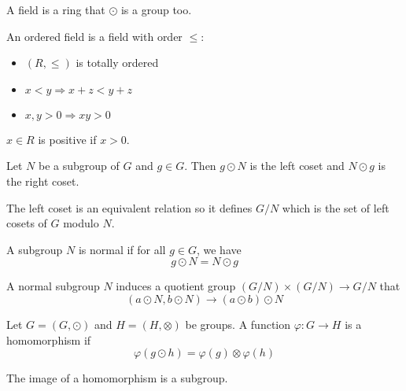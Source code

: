 \begin{definition}[field]
    A field is a ring that $\odot$ is a group too.
\end{definition}

\begin{definition}
    An ordered field is a field with order $\leq$:
    \begin{itemize}
        \item $(R, \leq)$ is totally ordered
        \item $x < y \Rightarrow x + z < y + z$
        \item $x,y > 0 \Rightarrow xy > 0$
    \end{itemize}
    
    $x \in R$ is positive if $x > 0$.
\end{definition}


\begin{definition}[coset]
    Let $N$ be a subgroup of $G$ and $g \in G$. Then $g \odot N$ is the left coset and $N \odot g$ is the right coset.
    
    The left coset is an equivalent relation so it defines $G/N$ which is the set of left cosets of $G$ modulo $N$.
\end{definition}

\begin{definition}[normal]
    A subgroup $N$ is normal if for all $g \in G$, we have 
    \begin{equation}
        g \odot N = N \odot g
    \end{equation}    
\end{definition}

\begin{definition}
    A normal subgroup $N$ induces a quotient group $(G/N) \times (G/N) \rightarrow G/N$ that 
    \begin{equation}
        (a \odot N, b \odot N) \rightarrow (a \odot b) \odot N
    \end{equation} 
\end{definition}

\begin{definition}[homomorphism]
    Let $G = (G, \odot)$ and $H = (H, \otimes)$ be groups. A function $\varphi: G \rightarrow H$ is a homomorphism if 
    \begin{equation}
        \varphi(g \odot h) = \varphi(g) \otimes \varphi(h)
    \end{equation}
    
    The image of a homomorphism is a subgroup.
\end{definition}

